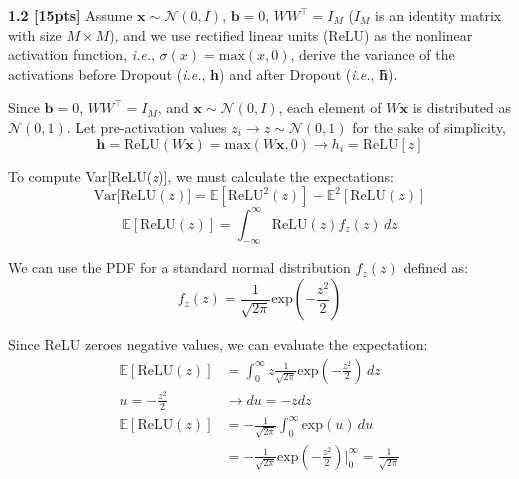\documentclass{article}
\begin{document}
\noindent
\textbf{1.2 [15pts]} Assume $\textbf{x} \sim \mathcal{N} (0, I)$, $\textbf{b} = 0$, $WW^{\top} = I_M$ ($I_M$ is an identity matrix with size $M \times M$), and we use rectified linear units (ReLU) as the nonlinear activation function, \textit{i.e.}, $\sigma (x) = \text{max}(x, 0)$, derive the variance of the activations before Dropout (\textit{i.e.}, \textbf{h}) and after Dropout (\textit{i.e.}, \textbf{\~h}).\\

{\color{blue}
Since $\textbf{b}=0$, $WW^{\top} = I_M$, and $\textbf{x} \sim \mathcal{N} (0, I)$, each element of $W\textbf{x}$ is distributed as $\mathcal{N} (0,1)$. Let pre-activation values $z_i \rightarrow z \sim \mathcal{N} (0, 1)$ for the sake of simplicity,
\begin{equation}
    \textbf{h}= \text{ReLU}(W \textbf{x})= \text{max}(W \textbf{x},0) \rightarrow h_i= \text{ReLU}[z]
\end{equation}

To compute Var[ReLU(\textit{z})], we must calculate the expectations:
\begin{equation}
    \text{Var[ReLU}(z)]= \mathbb{E}[\text{ReLU}^2(z)]- \mathbb{E}^2[\text{ReLU}(z)]
\end{equation}
\begin{equation}
    \mathbb{E}[\text{ReLU}(z)]= \int_{-\infty}^{\infty} \text{ReLU}(z) f_{z}(z) \,dz
\end{equation}

We can use the PDF for a standard normal distribution $f_{z}(z)$ defined as:
\begin{equation}
    f_{z}(z)= \frac{1}{\sqrt{2 \pi}} \text{exp}(-\frac{z^2}{2})
\end{equation}

Since ReLU zeroes negative values, we can evaluate the expectation:
\begin{equation}
\begin{aligned}
    \mathbb{E}[\text{ReLU}(z)] &= \int_{0}^{\infty} z  \frac{1}{\sqrt{2 \pi}} \text{exp}(-\frac{z^2}{2}) \,dz \\
    u=-\frac{z^2}{2} &\rightarrow du=-zdz\\
    \mathbb{E}[\text{ReLU}(z)] &= -\frac{1}{\sqrt{2 \pi}} \int_{0}^{\infty} \text{exp}(u) \,du\\
    &= -\frac{1}{\sqrt{2 \pi}} \text{exp}(-\frac{z^2}{2}) \Big|_{0}^{\infty}= \frac{1}{\sqrt{2 \pi}}
\end{aligned}
\end{equation}

}
\end{document}
